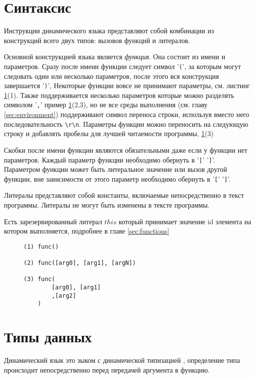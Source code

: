 \documentclass[../index.tex]{subfiles}
\begin{document}
\section{Синтаксис}

Инструкции динамического языка представляют собой комбинации из конструкций всего двух типов: вызовов функций и литералов.

Основной конструкцией языка является \textit{функция}. Она состоит из имени и параметров. 
Сразу после имени функции следует символ '\verb|(|', за которым могут следовать один или 
несколько параметров, после этого вся конструкция завершается '\verb|)|', 
Некоторые функции вовсе не принимают параметры, см. листинг \ref{lst:lecsic}(1). 
Также поддерживается несколько параметров которые можно разделять символом '\verb|,|'
пример \ref{lst:lecsic}(2,3), но не все среды выполнения (см. главу \ref{sec:environment}) 
поддерживают символ переноса строки, используя вместо него последовательность \verb|\r\n|.
Параметры функции можно переносить на следующую строку и добавлять пробелы для 
лучшей читаемости программы, \ref{lst:lecsic}(3)

Скобки после имени функции являются обязательными даже если у функции нет параметров.
Каждый параметр функции необходимо обернуть в '\verb|[|' '\verb|]|'.
Параметром функции может быть литеральное значение или вызов другой функции, вне зависимости от этого 
параметр необходимо обернуть в '\verb|[|' '\verb|]|'.

Литералы представляют собой константы, включаемые непосредственно в текст программы. 
Литералы не могут быть изменены в тексте программы.

Есть зарезервированный литерал $this$ который принимает значение id элемента на котором выполняется, 
подробнее в главе \ref{sec:functions}

\begin{figure}\label{lst:lecsic}
\begin{verbatim}
(1) func()

(2) func([arg0], [arg1], [argN])

(3) func(
        [arg0], [arg1]
        ,[arg2]
    )
\end{verbatim}        
\end{figure}

\section{Типы данных}\label{sec:types}

Динамический язык это зыком с динамической типизацией \footnotemark, определение типа происходит 
непосредственно перед передачей аргумента в функцию. 
\end{document}
